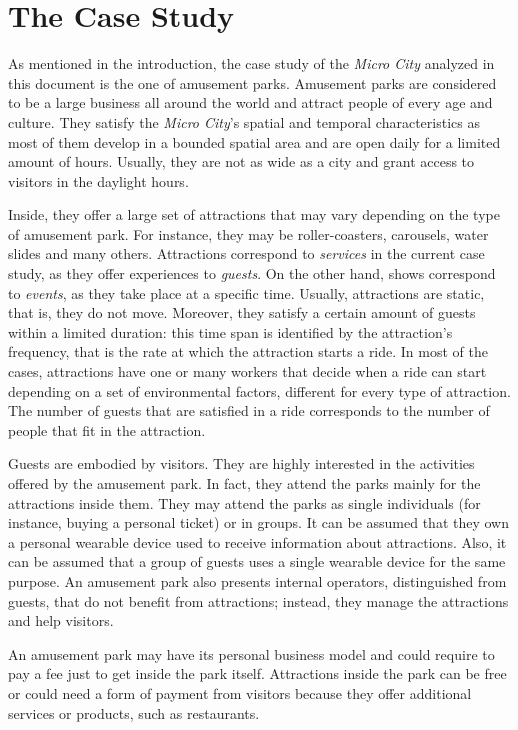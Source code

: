 \section{The Case Study}\label{sec:case}

As mentioned in the introduction, the case study of the \textit{Micro City} analyzed in this document is the one of amusement parks.
Amusement parks are considered to be a large business all around the world and attract people of every age and culture.
They satisfy the \textit{Micro City}'s spatial and temporal characteristics as most of them develop in a bounded spatial area and are open daily for a limited amount of hours.
Usually, they are not as wide as a city and grant access to visitors in the daylight hours.

Inside, they offer a large set of attractions that may vary depending on the type of amusement park.
For instance, they may be roller-coasters, carousels, water slides and many others.
Attractions correspond to \textit{services} in the current case study, as they offer experiences to \textit{guests}.
On the other hand, shows correspond to \textit{events}, as they take place at a specific time.
Usually, attractions are static, that is, they do not move.
Moreover, they satisfy a certain amount of guests within a limited duration: this time span is identified by the attraction's frequency, that is the rate at which the attraction starts a ride.
In most of the cases, attractions have one or many workers that decide when a ride can start depending on a set of environmental factors, different for every type of attraction.
The number of guests that are satisfied in a ride corresponds to the number of people that fit in the attraction.

Guests are embodied by visitors.
They are highly interested in the activities offered by the amusement park.
In fact, they attend the parks mainly for the attractions inside them.
They may attend the parks as single individuals (for instance, buying a personal ticket) or in groups.
It can be assumed that they own a personal wearable device used to receive information about attractions.
Also, it can be assumed that a group of guests uses a single wearable device for the same purpose.
An amusement park also presents internal operators, distinguished from guests, that do not benefit from attractions;
instead, they manage the attractions and help visitors.

An amusement park may have its personal business model and could require to pay a fee just to get inside the park itself.
Attractions inside the park can be free or could need a form of payment from visitors because they offer additional services or products, such as restaurants.

